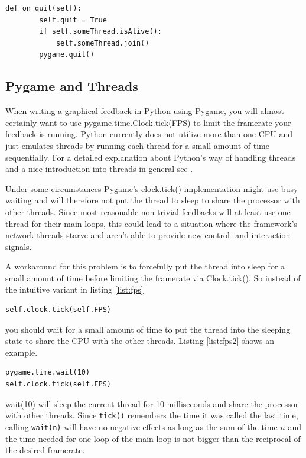 \begin{lstlisting}[caption=on\_quit method of the CursorArrow-Feedback., label={list:fca-quit}]
    def on_quit(self):
        self.quit = True
        if self.someThread.isAlive():
            self.someThread.join()
        pygame.quit()
\end{lstlisting}

\subsection{Pygame and Threads}
When writing a graphical feedback in Python using Pygame, you will almost certainly want to use pygame.time.Clock.tick(FPS) to limit the framerate your feedback is running. Python currently does not utilize more than one CPU and just emulates threads by running each thread for a small amount of time sequentially. For a detailed explanation about Python's way of handling threads and a nice introduction into threads in general see \cite{ref:pythreads}. 

Under some circumstances Pygame's clock.tick() implementation might use busy waiting and will therefore not put the thread to sleep to share the processor with other threads. Since most reasonable non-trivial feedbacks will at least use one thread for their main loops, this could lead to a situation where the framework's network threads starve and aren't able to provide new control- and interaction signals.

A workaround for this problem is to forcefully put the thread into sleep for a small amount of time before limiting the framerate via Clock.tick(). So instead of the intuitive variant in listing \ref{list:fps}

\begin{lstlisting}[caption=Limiting the framerate the intuitive (but wrong) way., label={list:fps}]
self.clock.tick(self.FPS)
\end{lstlisting}

you should wait for a small amount of time to put the thread into the sleeping state to share the CPU with the other threads. Listing \ref{list:fps2} shows an example.

\begin{lstlisting}[caption=A working alternative., label={list:fps2}]
pygame.time.wait(10)
self.clock.tick(self.FPS)
\end{lstlisting}

wait(10) will sleep the current thread for 10 milliseconds and share the processor with other threads. Since \lstinline+tick()+ remembers the time it was called the last time, calling \lstinline+wait(n)+ will have no negative effects as long as the sum of the time $n$ and the time needed for one loop of the main loop is not bigger than the reciprocal of the desired framerate.

